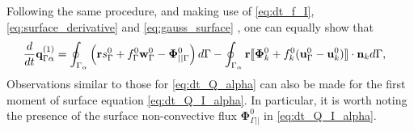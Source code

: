 Following the same procedure, and making use of \ref{eq:dt_f_I}, \ref{eq:surface_derivative} and \ref{eq:gauss_surface} , one can equally show that 
\begin{align}
    \ddt {\textbf{q}^{(1)}_{\Gamma\alpha}}
    &= \intS{ \left(
        \textbf{r}s_\Gamma^0
        + f_\Gamma^0 \textbf{w}_\Gamma^0
        - \mathbf{\Phi}_{||\Gamma}^0
    \right) }
    - \intS{\textbf{r} 
    \Jump{\mathbf{\Phi}_k^0
        + f_k^0 (\textbf{u}_\Gamma^0 - \textbf{u}_k^0)
    }
    },
    \label{eq:dt_Q_I_alpha}
\end{align}
Observations similar to those for \ref{eq:dt_Q_alpha} can also be made for the first moment of surface equation \eqref{eq:dt_Q_I_alpha}.
In particular, it is worth noting the presence of the surface non-convective flux $\mathbf{\Phi}_{\Gamma||}^0$ in \ref{eq:dt_Q_I_alpha}.

